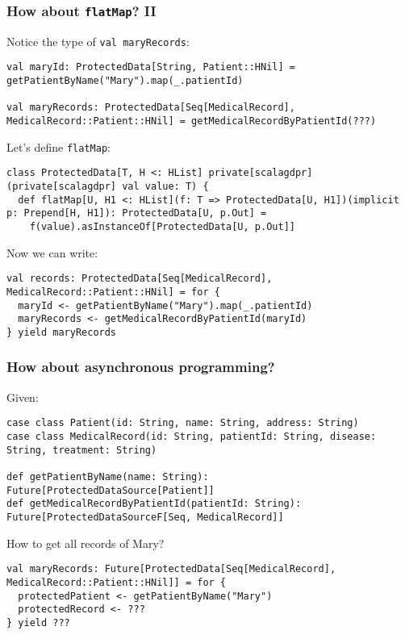 \documentclass[aspectratio=169]{beamer}
\begin{document}
\begin{frame}[fragile]
\frametitle{How about \texttt{flatMap}? II}
Notice the type of \texttt{val maryRecords}:
\begin{lstlisting}[style=myScalastyle,frame=none]
val maryId: ProtectedData[String, Patient::HNil] = getPatientByName("Mary").map(_.patientId)

val maryRecords: ProtectedData[Seq[MedicalRecord], MedicalRecord::Patient::HNil] = getMedicalRecordByPatientId(???)
\end{lstlisting}
\pause
Let's define \texttt{flatMap}:
\begin{lstlisting}[style=myScalastyle,frame=none]
class ProtectedData[T, H <: HList] private[scalagdpr](private[scalagdpr] val value: T) {
  def flatMap[U, H1 <: HList](f: T => ProtectedData[U, H1])(implicit p: Prepend[H, H1]): ProtectedData[U, p.Out] =
    f(value).asInstanceOf[ProtectedData[U, p.Out]]
\end{lstlisting}
\pause
Now we can write:
\begin{lstlisting}[style=myScalastyle,frame=none]
val records: ProtectedData[Seq[MedicalRecord], MedicalRecord::Patient::HNil] = for {
  maryId <- getPatientByName("Mary").map(_.patientId)
  maryRecords <- getMedicalRecordByPatientId(maryId)
} yield maryRecords
\end{lstlisting}

\end{frame}

\begin{frame}[fragile]
\frametitle{How about asynchronous programming?}
Given:
\begin{lstlisting}[style=myScalastyle,frame=none]
case class Patient(id: String, name: String, address: String)
case class MedicalRecord(id: String, patientId: String, disease: String, treatment: String)

def getPatientByName(name: String): Future[ProtectedDataSource[Patient]]
def getMedicalRecordByPatientId(patientId: String): Future[ProtectedDataSourceF[Seq, MedicalRecord]]
\end{lstlisting}
How to get all records of Mary?
\pause
\begin{lstlisting}[style=myScalastyle,frame=none]
val maryRecords: Future[ProtectedData[Seq[MedicalRecord], MedicalRecord::Patient::HNil]] = for {
  protectedPatient <- getPatientByName("Mary")
  protectedRecord <- ???
} yield ???
\end{lstlisting}

\end{frame}
\end{document}
